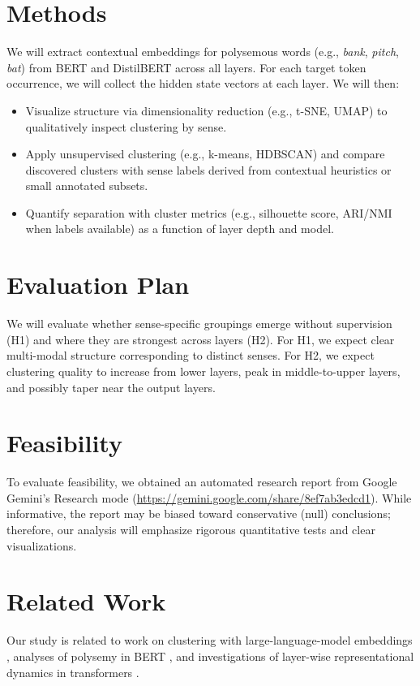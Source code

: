 \documentclass{template}
\begin{document}
\section*{Methods}
We will extract contextual embeddings for polysemous words (e.g., \textit{bank}, \textit{pitch}, \textit{bat}) from BERT and DistilBERT across all layers. For each target token occurrence, we will collect the hidden state vectors at each layer. We will then:
\begin{itemize}
    \item Visualize structure via dimensionality reduction (e.g., t\textsc{-}SNE, UMAP) to qualitatively inspect clustering by sense.
    \item Apply unsupervised clustering (e.g., k-means, HDBSCAN) and compare discovered clusters with sense labels derived from contextual heuristics or small annotated subsets.
    \item Quantify separation with cluster metrics (e.g., silhouette score, ARI/NMI when labels available) as a function of layer depth and model.
\end{itemize}

\section*{Evaluation Plan}
We will evaluate whether sense-specific groupings emerge without supervision (H1) and where they are strongest across layers (H2). For H1, we expect clear multi-modal structure corresponding to distinct senses. For H2, we expect clustering quality to increase from lower layers, peak in middle-to-upper layers, and possibly taper near the output layers.

\section*{Feasibility}
To evaluate feasibility, we obtained an automated research report from Google Gemini's Research mode (\url{https://gemini.google.com/share/8ef7ab3edcd1}). While informative, the report may be biased toward conservative (null) conclusions; therefore, our analysis will emphasize rigorous quantitative tests and clear visualizations.

\section*{Related Work}
Our study is related to work on clustering with large-language-model embeddings \cite{petukhova2025}, analyses of polysemy in BERT \cite{yenicelik2020}, and investigations of layer-wise representational dynamics in transformers \cite{nadipalli2025}.
\makereferences
\end{document}
